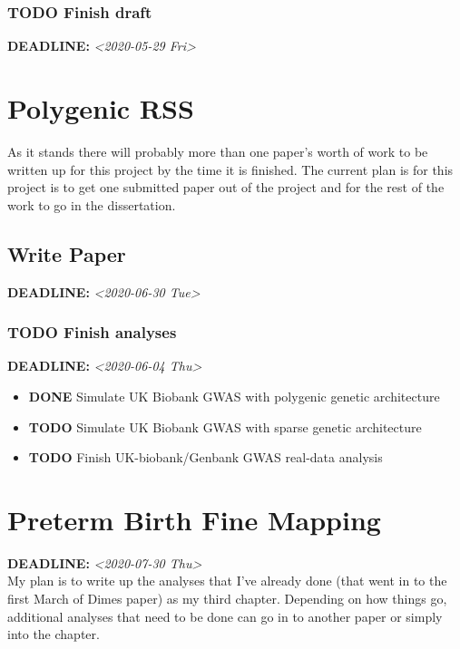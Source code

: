 \documentclass[11pt]{article}
\begin{document}
\subsubsection*{{\bfseries\sffamily TODO} Finish draft}
\label{sec:org215ba2a}
\noindent\textbf{DEADLINE:} \textit{<2020-05-29 Fri>}\\
\section*{Polygenic RSS}
\label{sec:org34344aa}
As it stands there will probably more than one paper's worth of work to be written up for this project
by the time it is finished. The current plan is for this project is to get one submitted paper out of 
the project and for the rest of the work to go in the dissertation.
\subsection*{Write Paper}
\label{sec:orgb322035}
\noindent\textbf{DEADLINE:} \textit{<2020-06-30 Tue>}\\
\subsubsection*{{\bfseries\sffamily TODO} Finish analyses}
\label{sec:org7602660}
\noindent\textbf{DEADLINE:} \textit{<2020-06-04 Thu>}\\
\begin{itemize}
\item {\bfseries\sffamily DONE}  Simulate UK Biobank GWAS with polygenic genetic architecture
\label{sec:org9820114}
\item {\bfseries\sffamily TODO}  Simulate UK Biobank GWAS with sparse genetic architecture
\label{sec:org57521dd}
\item {\bfseries\sffamily TODO}  Finish UK-biobank/Genbank GWAS real-data analysis
\label{sec:org00748ae}
\end{itemize}
\section*{Preterm Birth Fine Mapping}
\label{sec:org4d89bb9}
\noindent\textbf{DEADLINE:} \textit{<2020-07-30 Thu>}\\
My plan is to write up the analyses that I've already done (that went in to the first March of Dimes paper) as my third chapter.  Depending on how things go, additional 
analyses that need to be done can go in to another paper or simply into the chapter.
\end{document}
